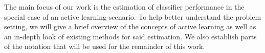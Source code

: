 \label{background}


The main focus of our work is the estimation of classifier performance in the special case of an active learning scenario. To help better understand the problem setting, we will give a brief overview of the concepts of active learning as well as an in-depth look of existing methods for said estimation. We also establish parts of the notation that will be used for the remainder of this work.

